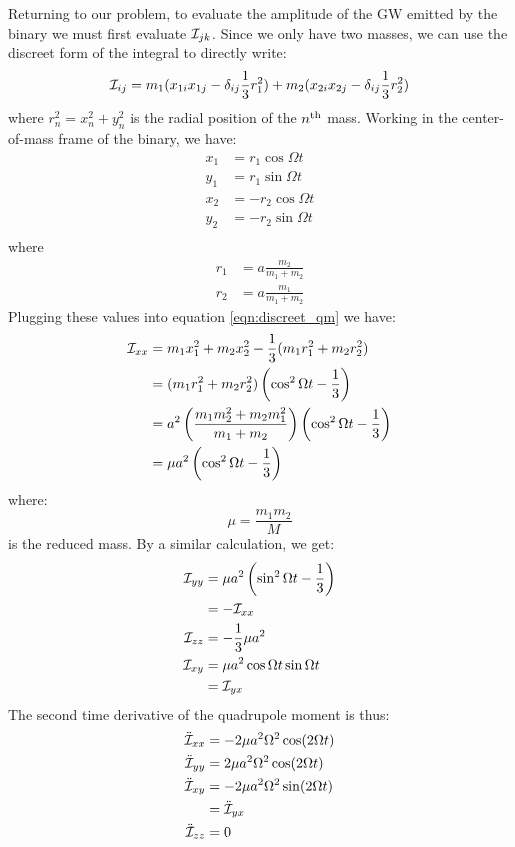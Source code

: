 Returning to our problem, to evaluate the amplitude of the \ac{GW} emitted by the binary we must first evaluate $\mathcal{I}_{jk}$. Since we only have two masses, we can use the discreet form of the integral to directly write:
\begin{equation}
\label{eqn:discreet_qm}
\qI_{ij} = m_1(x_{1i}x_{1j} - \delta_{ij}\frac{1}{3} r_1^2) + m_2(x_{2i}x_{2j} - \delta_{ij}\frac{1}{3}r_2^2)
\end{equation}
where $r_n^2 = x_n^2 + y_n^2$ is the radial position of the $n^{\mathrm{th}}$ mass. Working in the center-of-mass frame of the binary, we have:
\begin{align*}
x_1 &= r_1 \cos \Omega t \\
y_1 &= r_1 \sin \Omega t \\
x_2 &= - r_2 \cos \Omega t \\
y_2 &= - r_2 \sin \Omega t \\
\end{align*}
where
\begin{align}
r_1 &= a\frac{m_2}{m_1 + m_2} \\
r_2 &= a \frac{m_1}{m_1 + m_2}
\end{align}
Plugging these values into equation \ref{eqn:discreet_qm} we have:
\begin{align}
\mathcal{I}_{xx} &= m_1 x_1^2 + m_2 x_2^2 - \frac{1}{3}(m_1r_1^2 + m_2r_2^2) \nonumber \\
         &= (m_1r_1^2 + m_2r_2^2)\left(\cos^2 \Omega t - \frac{1}{3}\right) \nonumber \\
         &= a^2\left(\frac{m_1m_2^2 + m_2m_1^2}{m_1+m_2}\right)\left(\cos^2 \Omega t - \frac{1}{3}\right) \nonumber \\
         &= \mu a^2 \left(\cos^2 \Omega t - \frac{1}{3} \right)
\end{align}
where:
\begin{equation}
\label{eqn:reduced_mass}
\mu = \frac{m_1 m_2}{M}
\end{equation}
is the reduced mass. By a similar calculation, we get:
\begin{align}
\mathcal{I}_{yy} &= \mu a^2 \left(\sin^2 \Omega t - \frac{1}{3}\right) \\
         &= -\mathcal{I}_{xx} \\
\mathcal{I}_{zz} &= -\frac{1}{3} \mu a^2 \\
\mathcal{I}_{xy} &= \mu a^2 \cos \Omega t \sin \Omega t \\
         &= \mathcal{I}_{yx}
\end{align}
The second time derivative of the quadrupole moment is thus:
\begin{subequations}
\begin{align}
\ddot{\mathcal{I}}_{xx} &=  -2\mu a^2\Omega^2 \cos(2\Omega t) \\
\ddot{\mathcal{I}}_{yy} &=  2\mu a^2\Omega^2 \cos(2\Omega t)  \\
\ddot{\mathcal{I}}_{xy} &=  -2 \mu a^2 \Omega^2 \sin(2 \Omega t) \\
                &=  \ddot{\mathcal{I}}_{yx} \\
\ddot{\mathcal{I}}_{zz} &=  0
\end{align}
\label{eqn:second_deriv_qm}
\end{subequations}

